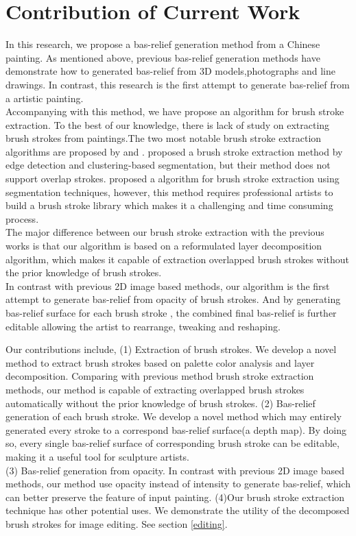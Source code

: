 \section{Contribution of Current Work}
In this research, we propose a bas-relief generation method from a Chinese painting. As mentioned above, previous bas-relief generation methods have demonstrate how to generated bas-relief from 3D models,photographs and line drawings. In contrast, this research is the first attempt to generate bas-relief from a artistic painting. \\ Accompanying with this method, we have propose an algorithm for brush stroke extraction. To the best of our knowledge, there is lack of study on extracting brush strokes from paintings.The two most notable brush stroke extraction algorithms are proposed by \cite{li2012rhythmic} and \cite{xu2006animating}. \cite{li2012rhythmic} proposed a brush stroke extraction method by edge detection and clustering-based segmentation, but their method does not support overlap strokes.\cite{xu2006animating} proposed a algorithm for brush stroke extraction using segmentation techniques, however, this method requires professional artists to build a brush stroke library which makes it a challenging and time consuming process. \\ 
The major difference between our brush stroke extraction with the previous works is that our algorithm is based on a reformulated layer decomposition algorithm, which makes it capable of extraction overlapped brush strokes without the prior knowledge of brush strokes.\\
In contrast with previous 2D image based methods, our algorithm is the first attempt to generate bas-relief from opacity of brush strokes. And by generating bas-relief surface for each brush stroke , the combined final bas-relief is further editable allowing the artist to rearrange, tweaking and reshaping.


Our contributions include,
\newline
(1) Extraction of brush strokes. We develop a novel method to extract brush strokes based on palette color analysis and layer decomposition.  Comparing with previous method brush stroke extraction methods, our method is capable of extracting overlapped brush strokes automatically without the prior knowledge of brush strokes. 
\newline
(2) Bas-relief generation of each brush stroke. We develop a novel method which may entirely generated every stroke to a correspond bas-relief surface(a depth map). By doing so, every single bas-relief surface of corresponding brush stroke can be editable, making it a useful tool for sculpture artists.\\
(3) Bas-relief generation from opacity. In contrast with previous 2D image based methods, our method use opacity instead of intensity to generate bas-relief, which can better preserve the feature of input painting. 
(4)Our brush stroke extraction technique has other potential uses. We demonstrate the utility of the decomposed brush strokes for image editing. See section \ref{editing}.

